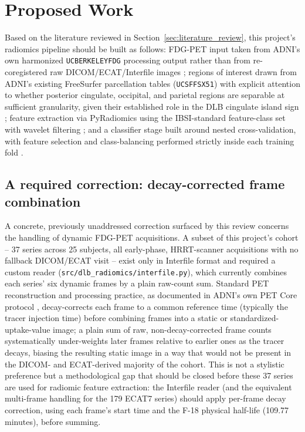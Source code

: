 \section{Proposed Work}
\label{sec:proposed_work}

Based on the literature reviewed in Section~\ref{sec:literature_review}, this project's radiomics pipeline should be built as follows: FDG-PET input taken from ADNI's own harmonized \texttt{UCBERKELEYFDG} processing output rather than from re-coregistered raw DICOM/ECAT/Interfile images \cite{jagust2024petcore,jagust2010petcore}; regions of interest drawn from ADNI's existing FreeSurfer parcellation tables (\texttt{UCSFFSX51}) with explicit attention to whether posterior cingulate, occipital, and parietal regions are separable at sufficient granularity, given their established role in the DLB cingulate island sign \cite{mckeith2017dlb,lim2009cingulateisland}; feature extraction via PyRadiomics using the IBSI-standard feature-class set with wavelet filtering \cite{vangriethuysen2017pyradiomics,zwanenburg2020ibsi}; and a classifier stage built around nested cross-validation, with feature selection and class-balancing performed strictly inside each training fold \cite{demircioglu2021bias,demircioglu2024oversampling}.

\subsection{A required correction: decay-corrected frame combination}

A concrete, previously unaddressed correction surfaced by this review concerns the handling of dynamic FDG-PET acquisitions. A subset of this project's cohort -- 37 series across 25 subjects, all early-phase, HRRT-scanner acquisitions with no fallback DICOM/ECAT visit -- exist only in Interfile format and required a custom reader (\texttt{src/dlb\_radiomics/interfile.py}), which currently combines each series' six dynamic frames by a plain raw-count sum. Standard PET reconstruction and processing practice, as documented in ADNI's own PET Core protocol \cite{jagust2010petcore}, decay-corrects each frame to a common reference time (typically the tracer injection time) before combining frames into a static or standardized-uptake-value image; a plain sum of raw, non-decay-corrected frame counts systematically under-weights later frames relative to earlier ones as the tracer decays, biasing the resulting static image in a way that would not be present in the DICOM- and ECAT-derived majority of the cohort. This is not a stylistic preference but a methodological gap that should be closed before these 37 series are used for radiomic feature extraction: the Interfile reader (and the equivalent multi-frame handling for the 179 ECAT7 series) should apply per-frame decay correction, using each frame's start time and the F-18 physical half-life (109.77 minutes), before summing.

